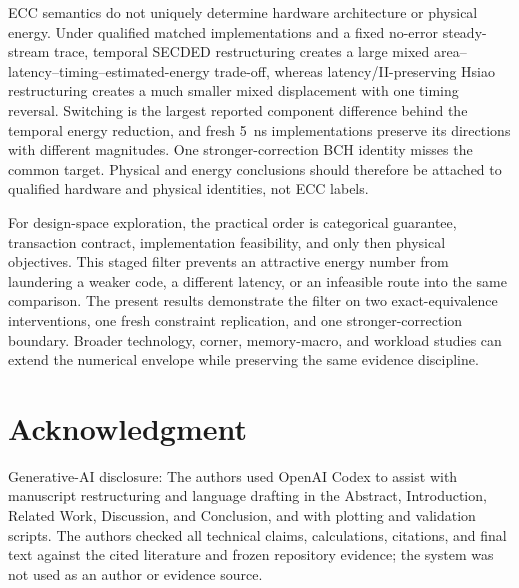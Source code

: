 \documentclass[conference,10pt]{IEEEtran}
\begin{document}
ECC semantics do not uniquely determine hardware architecture or physical energy. Under qualified matched implementations and a fixed no-error steady-stream trace, temporal SECDED restructuring creates a large mixed area--latency--timing--estimated-energy trade-off, whereas latency/II-preserving Hsiao restructuring creates a much smaller mixed displacement with one timing reversal. Switching is the largest reported component difference behind the temporal energy reduction, and fresh 5~ns implementations preserve its directions with different magnitudes. One stronger-correction BCH identity misses the common target. Physical and energy conclusions should therefore be attached to qualified hardware and physical identities, not ECC labels.

For design-space exploration, the practical order is categorical guarantee, transaction contract, implementation feasibility, and only then physical objectives. This staged filter prevents an attractive energy number from laundering a weaker code, a different latency, or an infeasible route into the same comparison. The present results demonstrate the filter on two exact-equivalence interventions, one fresh constraint replication, and one stronger-correction boundary. Broader technology, corner, memory-macro, and workload studies can extend the numerical envelope while preserving the same evidence discipline.

\section*{Acknowledgment}
Generative-AI disclosure: The authors used OpenAI Codex to assist with manuscript restructuring and language drafting in the Abstract, Introduction, Related Work, Discussion, and Conclusion, and with plotting and validation scripts. The authors checked all technical claims, calculations, citations, and final text against the cited literature and frozen repository evidence; the system was not used as an author or evidence source.

\clearpage
{}


\end{document}
